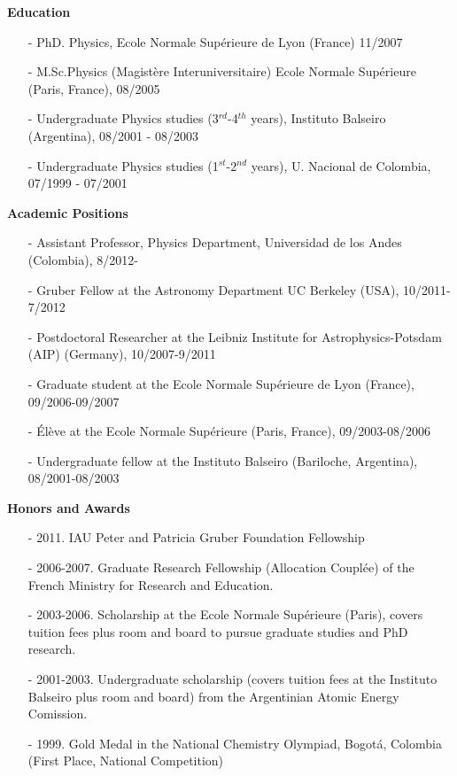 \documentclass[11pt]{article}
\begin{document}
{\bf Education}
\indent
\begin{itemize}
\item[-] PhD. Physics, Ecole Normale Sup\'erieure de Lyon (France) 11/2007
\item[-] M.Sc.Physics (Magistère Interuniversitaire)  Ecole Normale
  Sup\'erieure (Paris, France), 08/2005
\item[-] Undergraduate Physics studies (3$^{rd}$-4$^{th}$ years),
  Instituto Balseiro (Argentina), 08/2001 - 08/2003
\item[-] Undergraduate Physics studies (1$^{st}$-2$^{nd}$ years),
  U. Nacional de Colombia, 07/1999 -  07/2001
\end{itemize}
\newpage
{\bf Academic Positions}
\begin{itemize}
\item[-] Assistant Professor, Physics Department, Universidad de los Andes (Colombia), 8/2012-
\item[-] Gruber Fellow at the Astronomy Department UC Berkeley (USA), 10/2011-7/2012
\item[-] Postdoctoral Researcher at the Leibniz Institute for
  Astrophysics-Potsdam (AIP) (Germany), 10/2007-9/2011  
\item[-] Graduate student at the Ecole Normale Sup\'erieure de Lyon
  (France), 09/2006-09/2007  
\item[-] \'El\`eve at the Ecole Normale Sup\'erieure (Paris, France),
  09/2003-08/2006 
\item[-] Undergraduate fellow at the Instituto Balseiro (Bariloche,
  Argentina), 08/2001-08/2003 
\end{itemize}


{\bf Honors and Awards}
\begin{itemize}
\item[-] 2011. IAU Peter and Patricia Gruber Foundation Fellowship
\item[-] 2006-2007. Graduate Research Fellowship (Allocation Coupl\'ee) of the French
  Ministry for Research and Education.
\item[-] 2003-2006. Scholarship at the Ecole Normale Sup\'erieure (Paris), covers tuition fees plus room and
  board to pursue graduate studies and PhD research.
\item[-] 2001-2003. Undergraduate scholarship (covers tuition fees at the
  Instituto Balseiro plus room and board) from the Argentinian Atomic Energy
  Comission.
\item[-] 1999. Gold Medal in the National Chemistry Olympiad, Bogot\'a,
  Colombia (First Place, National Competition)
\end{itemize}
\end{document}
